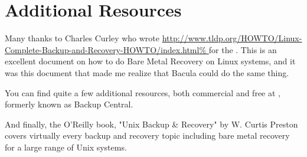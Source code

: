 \label{Resources}

\section{Additional Resources}

Many thanks to Charles Curley who wrote 
{\url{http://www.tldp.org/HOWTO/Linux-Complete-Backup-and-Recovery-HOWTO/index.html%
}} for the 
. This is an
excellent document on how to do Bare Metal Recovery on Linux systems, and it
was this document that made me realize that Bacula could do the same thing. 

You can find quite a few additional resources, both commercial and free at 
, formerly known as
Backup Central. 

And finally, the O'Reilly book, "Unix Backup \& Recovery" by W. Curtis
Preston covers virtually every backup and recovery topic including bare metal
recovery for a large range of Unix systems. 
